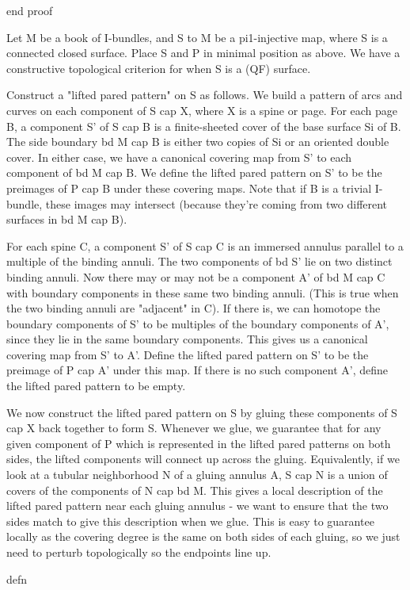 end proof

Let M be a book of I-bundles, and S to M be a pi1-injective map, where S is
a connected closed surface.  Place S and P in minimal position as above. We
have a constructive topological criterion for when S is a (QF) surface.

Construct a "lifted pared pattern" on S as follows. We build a pattern of arcs
and curves on each component of S cap X, where X is a spine or page. For each
page B, a component S' of S cap B is a finite-sheeted cover of the base surface
Si of B. The side boundary bd M cap B is either two copies of Si or an oriented
double cover. In either case, we have a canonical covering map from S' to each
component of bd M cap B. We define the lifted pared pattern on S' to be the
preimages of P cap B under these covering maps. Note that if B is a trivial
I-bundle, these images may intersect (because they're coming from two different
surfaces in bd M cap B).

For each spine C, a component S' of S cap C is an immersed annulus parallel to
a multiple of the binding annuli.  The two components of bd S' lie on two
distinct binding annuli. Now there may or may not be a component A' of bd M cap
C with boundary components in these same two binding annuli. (This is true when
the two binding annuli are "adjacent" in C). If there is, we can homotope the
boundary components of S' to be multiples of the boundary components of A',
since they lie in the same boundary components. This gives us a canonical
covering map from S' to A'. Define the lifted pared pattern on S' to be the
preimage of P cap A' under this map. If there is no such component A', define
the lifted pared pattern to be empty.

We now construct the lifted pared pattern on S by gluing these components of
S cap X back together to form S. Whenever we glue, we guarantee that for any
given component of P which is represented in the lifted pared patterns on both
sides, the lifted components will connect up across the gluing.  Equivalently,
if we look at a tubular neighborhood N of a gluing annulus A, S cap N is
a union of covers of the components of N cap bd M. This gives a local
description of the lifted pared pattern near each gluing annulus - we want to
ensure that the two sides match to give this description when we glue. This is
easy to guarantee locally as the covering degree is the same on both sides of
each gluing, so we just need to perturb topologically so the endpoints line up.

defn

